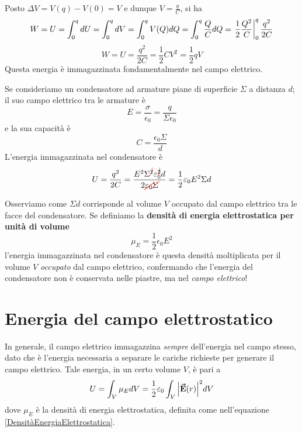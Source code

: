 Posto $\Delta V=V(q)-V(0)=V$ e dunque $V=\frac{q}{C}$, si ha
\begin{equation*}
	W=U=\int_{0}^{q}dU=\int_{0}^{q}dV=\int_0^{q}V(Q)dQ=\int_{0}^{q}\frac{Q}{C}dQ=\eval{\frac{1}{2}\frac{Q^2}{C}}_{0}^{q}\frac{q^2}{2C}
\end{equation*}
\begin{equation}
	W=U=\frac{q^2}{2C}=\frac{1}{2}CV^2=\frac{1}{2}qV
\end{equation}
Questa energia è immagazzinata fondamentalmente nel campo elettrico.
\begin{examplewt}
	Se consideriamo un condensatore ad armature piane di superficie $\Sigma$ a distanza $d$; il suo campo elettrico tra le armature è
	\begin{equation*}
		E=\frac{\sigma}{\epsilon_0}=\frac{q}{\Sigma \epsilon_0}
	\end{equation*}
	e la sua capacità è
	\begin{equation*}
		C=\frac{\epsilon_0\Sigma}{d}
	\end{equation*}
	L'energia immagazzinata nel condensatore è
	\begin{equation*}
		U=\frac{q^2}{2C}=\frac{E^2\Sigma^{\Ccancel[red]{2}}\epsilon_0^{\Ccancel[red]{2}} d}{2\Ccancel[red]{\epsilon_0}\Ccancel[red]{\Sigma}}=\frac{1}{2}\epsilon_0E^2\Sigma d
	\end{equation*}
\end{examplewt} 
Osserviamo come $\Sigma d$ corrisponde al volume $V$ occupato dal campo elettrico tra le facce del condensatore. Se definiamo la \textbf{densità di energia elettrostatica per unità di volume}
\begin{equation}\label{DensitàEnergiaElettrostatica}
	\mu_{E}=\frac{1}{2}\epsilon_0E^2
\end{equation}
l'energia immagazzinata nel condensatore è questa densità moltiplicata per il volume $V$ \textit{occupato} dal campo elettrico, confermando che l'energia del condensatore non è conservata nelle piastre, ma nel \textit{campo elettrico}!\\
\section{Energia del campo elettrostatico}
In generale, il campo elettrico immagazzina \textit{sempre} dell'energia nel campo stesso, dato che è l'energia necessaria a separare le cariche richieste per generare il campo elettrico. Tale energia, in un certo volume $V$, è pari a
\begin{equation}
	U=\int_V\mu_EdV=\frac{1}{2}\varepsilon_0\int_V\abs{\vb*{\va{E}}(r)}^2dV
\end{equation}
dove $\mu_E$ è la densità di energia elettrostatica, definita come nell'equazione \eqref{DensitàEnergiaElettrostatica}.
